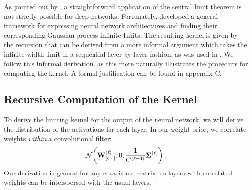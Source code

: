 \documentclass[tablecaption=bottom,wcp,nonatbib]{jmlr} %
\begin{document}
As pointed out by \citet{matthews2018dnnlimit}, a straightforward application of the central limit theorem is not strictly possible for deep networks. Fortunately, \citet{yang2019wide} developed a general framework for expressing neural network architectures and finding their corresponding Gaussian process infinite limits. The resulting kernel is given by the recursion that can be derived from a more informal argument which takes the infinite width limit in a sequential layer-by-layer fashion, as was used in \citet{garriga2018infiniteconv}. We follow this informal derivation, as this more naturally illustrates the procedure for computing the kernel. A formal justification can be found in appendix C.

\subsection{Recursive Computation of the Kernel}
To derive the limiting kernel for the output of the neural network, we will derive the distribution of the activations for each layer. In our weight prior, we correlate weights \emph{within} a convolutional filter:
\begin{align}
    \NormDist{\layerW{\ell}_{[c\gamma :]}; 0, \frac{1}{\layerC{\ell-1}} \priorWcov{\ell}} \,.
    \label{eq:correlated-weight-prior}
\end{align}
Our derivation is general for any covariance matrix, so layers with correlated weights can be interspersed with the usual layers.
\end{document}
